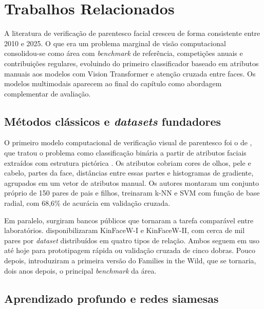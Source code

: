 \chapter[Trabalhos Relacionados]{Trabalhos Relacionados}
\label{cap:trabalhos-relacionados}

A literatura de verificação de parentesco facial cresceu de forma consistente entre 2010 e 2025. O que era um problema marginal de visão computacional consolidou-se como área com \textit{benchmark} de referência, competições anuais e contribuições regulares, evoluindo do primeiro classificador baseado em atributos manuais aos modelos com Vision Transformer e atenção cruzada entre faces. Os modelos multimodais aparecem ao final do capítulo como abordagem complementar de avaliação.

\section{Métodos clássicos e \textit{datasets} fundadores}

O primeiro modelo computacional de verificação visual de parentesco foi o de , que tratou o problema como classificação binária a partir de atributos faciais extraídos com estrutura pictórica \cite{felzenszwalb2005pictorial}. Os atributos cobriam cores de olhos, pele e cabelo, partes da face, distâncias entre essas partes e histogramas de gradiente, agrupados em um vetor de atributos manual. Os autores montaram um conjunto próprio de 150 pares de pais e filhos, treinaram k-NN e SVM com função de base radial, com 68,6\% de acurácia em validação cruzada.

Em paralelo, surgiram bancos públicos que tornaram a tarefa comparável entre laboratórios. 
disponibilizaram KinFaceW-I e KinFaceW-II, com cerca de mil pares por \textit{dataset} distribuídos em quatro tipos de relação. Ambos seguem em uso até hoje para prototipagem rápida ou validação cruzada de cinco dobras. Pouco depois, 
introduziram a primeira versão do Families in the Wild, que se tornaria, dois anos depois, o principal \textit{benchmark} da área.

\section{Aprendizado profundo e redes siamesas}


